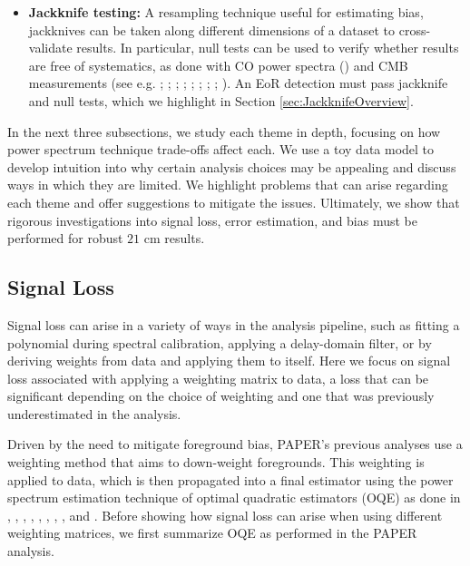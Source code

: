 \documentclass[preprint2,numberedappendix,tighten]{aastex6}  %
\begin{document}
\begin{itemize}
\item \textbf{Jackknife testing:} A resampling technique useful for estimating bias, jackknives can be taken along different 
dimensions of a dataset to cross-validate results. In particular, null tests can be used to verify whether results are free of 
systematics, as done with CO power spectra (\citealt{keating_et_al2016}) and CMB measurements (see e.g. \citealt{ade_et_al2008}; \citealt{chiang_et_al2010}; \citealt{bischoff_et_al2011}; \citealt{das_et_al2011b}; \citealt{araujo_et_al2012}; \citealt{crites_et_al2015}; \citealt{ade_et_al2016}; \citealt{ade_et_al2017}; \citealt{sherwin_et_al2017}). An EoR detection must pass jackknife and null tests, which we highlight in Section \ref{sec:JackknifeOverview}.
\end{itemize}

In the next three subsections, we study each theme in depth, focusing on how power spectrum technique trade-offs affect each. 
We use a toy data model to develop intuition into why certain analysis choices may be appealing and discuss ways in which 
they are limited. We highlight problems that can arise regarding each theme and offer suggestions to mitigate the issues. 
Ultimately, we show that rigorous investigations into signal loss, error estimation, and bias must be performed for robust $21$ 
cm results.


\subsection{Signal Loss}
\label{sec:SiglossOverview}

Signal loss can arise in a variety of ways in the analysis pipeline, such as fitting a polynomial during 
spectral calibration, applying a delay-domain filter, or by deriving weights from data and applying them to itself. Here we focus on signal loss associated with 
applying a weighting matrix to data, a loss that can be significant depending on the choice of weighting and one that was 
previously underestimated in the  analysis.

Driven by the need to mitigate foreground bias, PAPER's previous analyses use a weighting method that aims to down-weight 
foregrounds. This weighting is applied to data, which is then propagated into a final estimator using the power spectrum 
estimation technique of optimal quadratic estimators (OQE) as done in \citet{liu_tegmark2011}, \citet{dillon_et_al2013a}, \citet{liu_et_al2014a}, \citet{liu_et_al2014b}, \citet{trott_et_al2012}, \citet{dillon_et_al2014}, \citet{dillon_et_al2015}, \citet{switzer_et_al2015}, and \citet{trott_et_al2016}. Before showing 
how signal loss can arise when using different weighting matrices, we first summarize OQE as performed in the PAPER 
analysis.
\end{document}
